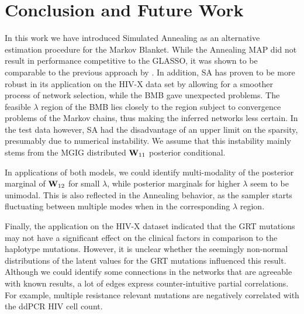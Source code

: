 \chapter{Conclusion and Future Work}
In this work we have introduced Simulated Annealing as an alternative estimation procedure for the Markov Blanket.
While the Annealing MAP did not result in performance competitive to the GLASSO, it was shown to be comparable to the previous approach by \cite{kaufmann_bayesian_2015}.
In addition, SA has proven to be more robust in its application on the HIV-X data set by allowing for a smoother process of network selection, while the BMB gave unexpected problems.
The feasible $\lambda$ region of the BMB lies closely to the region subject to convergence problems of the Markov chains, thus making the inferred networks less certain.
In the test data however, SA had the disadvantage of an upper limit on the sparsity, presumably due to numerical instability.
We assume that this instability mainly stems from the MGIG distributed $\mathbf{W}_{11}$ posterior conditional. 

In applications of both models, we could identify multi-modality of the posterior marginal of $\mathbf{W}_{12}$ for small $\lambda$, while posterior marginals for higher $\lambda$ seem to be unimodal.
This is also reflected in the Annealing behavior, as the sampler starts fluctuating between multiple modes when in the corresponding $\lambda$ region.

Finally, the application on the HIV-X dataset indicated that the GRT mutations may not have a significant effect on the clinical factors in comparison to the haplotype mutations. However, it is unclear whether the seemingly non-normal distributions of the latent values for the GRT mutations influenced this result.
 Although we could identify some connections in the networks that are agreeable with known results, a lot of edges express counter-intuitive partial correlations.
For example, multiple resistance relevant mutations are negatively correlated with the ddPCR HIV cell count.


